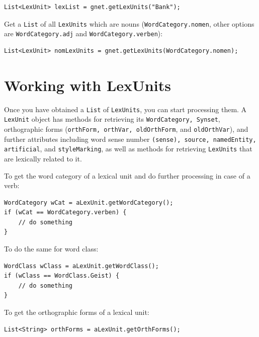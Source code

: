 \documentclass[12pt,a4paper,english,utf8]{report}
\begin{document}
\begin{lstlisting}
List<LexUnit> lexList = gnet.getLexUnits("Bank");
\end{lstlisting}

\begin{sloppypar}
Get a \texttt{List} of all \texttt{LexUnits} which are nouns (\texttt{WordCategory.nomen}, other options are \texttt{WordCategory.adj} and \texttt{WordCategory.verben}):
\end{sloppypar}

\begin{lstlisting}
List<LexUnit> nomLexUnits = gnet.getLexUnits(WordCategory.nomen);
\end{lstlisting}



\section{Working with LexUnits}

\begin{sloppypar}
Once you have obtained a \texttt{List} of \texttt{LexUnits}, you can start processing them. A \texttt{LexUnit} object has methods for retrieving its \texttt{WordCategory, Synset}, orthographic forms (\texttt{orthForm, orthVar, oldOrthForm}, and \texttt{oldOrthVar}), and further attributes including word sense number \texttt{(sense), source, namedEntity, artificial}, and \texttt{styleMarking}, as well as methods for retrieving \texttt{LexUnits} that are lexically related to it.
\end{sloppypar}

To get the word category of a lexical unit and do further processing in case of a verb:

\begin{lstlisting}
WordCategory wCat = aLexUnit.getWordCategory();
if (wCat == WordCategory.verben) {
    // do something
}
\end{lstlisting}

To do the same for word class:

\begin{lstlisting}
WordClass wClass = aLexUnit.getWordClass();
if (wClass == WordClass.Geist) {
    // do something
}
\end{lstlisting}

To get the orthographic forms of a lexical unit:

\begin{lstlisting}
List<String> orthForms = aLexUnit.getOrthForms();
\end{lstlisting}
\end{document}
